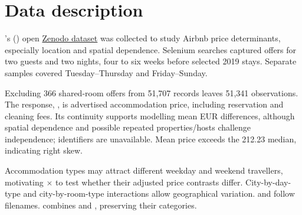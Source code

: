 \section{Data description}

\citeauthor{gyodi2021}'s (\citeyear{gyodi2021}) open \href{https://doi.org/10.5281/zenodo.4446043}{Zenodo dataset} was collected to study Airbnb price determinants, especially location and spatial dependence. Selenium searches captured offers for two guests and two nights, four to six weeks before selected 2019 stays. Separate samples covered Tuesday--Thursday and Friday--Sunday.

Excluding 366 shared-room offers from 51,707 records leaves 51,341 observations. The response, , is advertised accommodation price, including reservation and cleaning fees. Its continuity supports modelling mean EUR differences, although spatial dependence and possible repeated properties/hosts challenge independence; identifiers are unavailable. Mean price exceeds the \texteuro{}212.23 median, indicating right skew.

Accommodation types may attract different weekday and weekend travellers, motivating  \(\times\)  to test whether their adjusted price contrasts differ. City-by-day-type and city-by-room-type interactions allow geographical variation.  and  follow filenames.  combines  and , preserving their categories.

